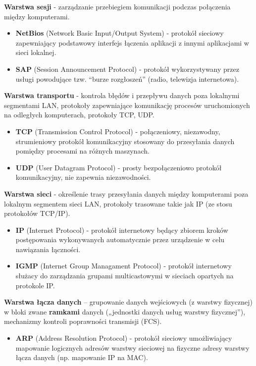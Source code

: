 \documentclass[12pt]{article}
\begin{document}
    \noindent \textbf{Warstwa sesji} - zarządzanie przebiegiem komunikacji podczas
    połączenia między komputerami.
    \begin{itemize}
        \item \textbf{NetBios} (Network Basic Input/Output System) - protokół sieciowy zapewniający podstawowy interfejs
        łączenia aplikacji z innymi aplikacjami w sieci lokalnej.
        \item \textbf{SAP} (Session Announcement Protocol) - protokół wykorzystywany przez usługi powodujące tzw.
        ``burze rozgłoszeń'' (radio, telewizja internetowa).
    \end{itemize}

    \noindent \textbf{Warstwa transportu} - kontrola błędów i przepływu danych
    poza lokalnymi segmentami LAN, protokoły zapewniające
    komunikację procesów uruchomionych na odległych komputerach, protokoły TCP, UDP.
    \begin{itemize}
        \item \textbf{TCP} (Transmission Control Protocol) - połączeniowy, niezawodny, strumieniowy protokół komunikacyjny
        stosowany do przesyłania danych pomiędzy procesami na różnych maszynach.
        \item \textbf{UDP} (User Datagram Protocol) - prosty bezpołączeniowo protokół komunikacyjny, nie zapewnia
        niezawodności.
    \end{itemize}

    \noindent \textbf{Warstwa sieci} - określenie trasy przesyłania
    danych między komputerami poza lokalnym segmentem sieci LAN, protokoły trasowane takie jak IP (ze stosu protokołów TCP/IP).
    \begin{itemize}
        \item \textbf{IP} (Internet Protocol) - protokół internetowy będący zbiorem kroków
        postępowania wykonywanych automatycznie przez urządzenie w celu nawiązania łączności.
        \item \textbf{IGMP} (Internet Group Managament Protocol) - protokół internetowy służacy do zarządzania
        grupami multicastowymi w sieciach opartych na protokole IP.
    \end{itemize}

    \noindent \textbf{Warstwa łącza danych} – grupowanie danych wejściowych (z warstwy fizycznej) w bloki zwane \textbf{ramkami} danych („jednostki
    danych usług warstwy fizycznej”), mechanizmy kontroli poprawności
    transmisji (FCS).
    \begin{itemize}
        \item \textbf{ARP} (Address Resolution Protocol) - protokół sieciowy umożliwiający mapowanie logicznych
        adresów warstwy sieciowej na fizyczne adresy warstwy łącza danych (np. mapowanie IP na MAC).
    \end{itemize}
\end{document}

